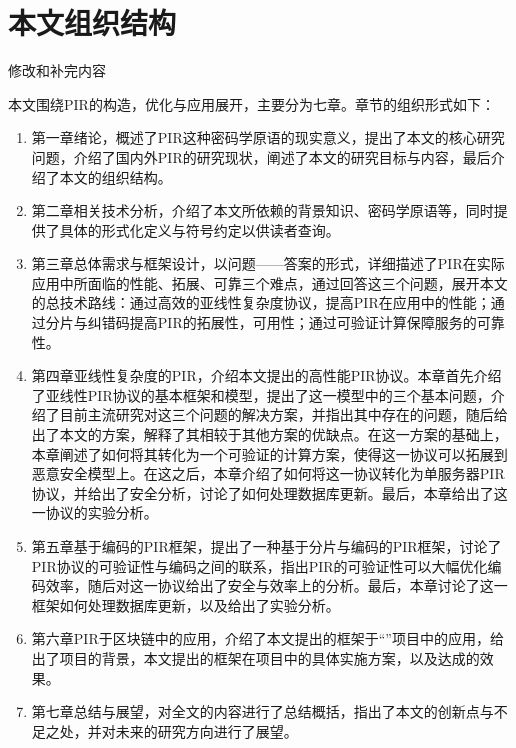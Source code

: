 \section{本文组织结构}
{修改和补完内容}

本文围绕PIR的构造，优化与应用展开，主要分为七章。章节的组织形式如下：
\begin{enumerate}
    \item 第一章绪论，概述了PIR这种密码学原语的现实意义，提出了本文的核心研究问题，介绍了国内外PIR的研究现状，阐述了本文的研究目标与内容，最后介绍了本文的组织结构。
    \item 第二章相关技术分析，介绍了本文所依赖的背景知识、密码学原语等，同时提供了具体的形式化定义与符号约定以供读者查询。
    \item 第三章总体需求与框架设计，以问题——答案的形式，详细描述了PIR在实际应用中所面临的性能、拓展、可靠三个难点，通过回答这三个问题，展开本文的总技术路线：通过高效的亚线性复杂度协议，提高PIR在应用中的性能；通过分片与纠错码提高PIR的拓展性，可用性；通过可验证计算保障服务的可靠性。
    \item 第四章亚线性复杂度的PIR，介绍本文提出的高性能PIR协议。本章首先介绍了亚线性PIR协议的基本框架和模型，提出了这一模型中的三个基本问题，介绍了目前主流研究对这三个问题的解决方案，并指出其中存在的问题，随后给出了本文的方案，解释了其相较于其他方案的优缺点。在这一方案的基础上，本章阐述了如何将其转化为一个可验证的计算方案，使得这一协议可以拓展到恶意安全模型上。在这之后，本章介绍了如何将这一协议转化为单服务器PIR协议，并给出了安全分析，讨论了如何处理数据库更新。最后，本章给出了这一协议的实验分析。
    \item 第五章基于编码的PIR框架，提出了一种基于分片与编码的PIR框架，讨论了PIR协议的可验证性与编码之间的联系，指出PIR的可验证性可以大幅优化编码效率，随后对这一协议给出了安全与效率上的分析。最后，本章讨论了这一框架如何处理数据库更新，以及给出了实验分析。
    \item 第六章PIR于区块链中的应用，介绍了本文提出的框架于“\projectname”项目中的应用，给出了项目的背景，本文提出的框架在项目中的具体实施方案，以及达成的效果。
    \item 第七章总结与展望，对全文的内容进行了总结概括，指出了本文的创新点与不足之处，并对未来的研究方向进行了展望。
\end{enumerate}